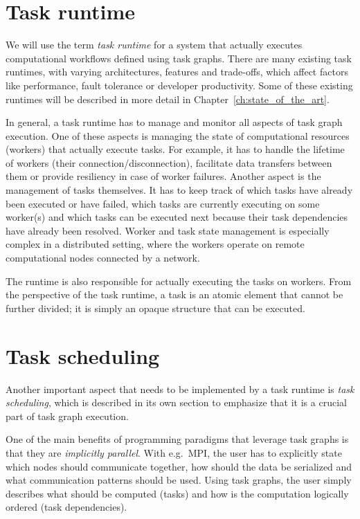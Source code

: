 \section{Task runtime}
We will use the term \emph{task runtime} for a system that actually executes computational
workflows defined using task graphs. There are many existing task runtimes, with varying
architectures, features and trade-offs, which affect factors like performance, fault tolerance or
developer productivity. Some of these existing runtimes will be described in more detail in
Chapter~\ref{ch:state_of_the_art}.

In general, a task runtime has to manage and monitor all aspects of task graph execution. One of
these aspects is managing the state of computational resources (workers) that actually execute
tasks. For example, it has to handle the lifetime of workers (their connection/disconnection),
facilitate data transfers between them or provide resiliency in case of worker failures. Another
aspect is the management of tasks themselves. It has to keep track of which tasks have already been
executed or have failed, which tasks are currently executing on some worker(s) and which tasks can
be executed next because their task dependencies have already been resolved. Worker and task state
management is especially complex in a distributed setting, where the workers operate on remote
computational nodes connected by a network.

The runtime is also responsible for actually executing the tasks on workers. From the perspective
of the task runtime, a task is an atomic element that cannot be further divided; it is simply an
opaque structure that can be executed.

\section{Task scheduling}
Another important aspect that needs to be implemented by a task runtime is \emph{task scheduling},
which is described in its own section to emphasize that it is a crucial part of task graph
execution.

One of the main benefits of programming paradigms that leverage task graphs is that they are
\emph{implicitly parallel}. With e.g.\ MPI, the user has to explicitly state which nodes should
communicate together, how should the data be serialized and what communication patterns should be
used. Using task graphs, the user simply describes what should be computed (tasks) and how is the
computation logically ordered (task dependencies).

